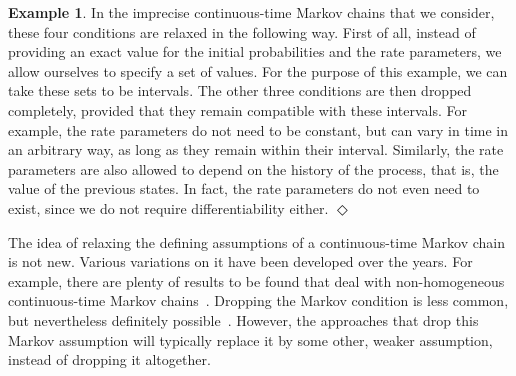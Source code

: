 \documentclass[10pt,a4paper]{paper}
\theoremstyle{definition}
\newtheorem{exmp}{Example}%
\newcommand{\exampleend}{\hfill$\Diamond$}
\begin{document}
\begin{exmp}




In the imprecise continuous-time Markov chains that we consider, these four conditions are relaxed in the following way. First of all, instead of providing an exact value for the initial probabilities and the rate parameters, we allow ourselves to specify a set of values. For the purpose of this example, we can take these sets to be intervals. The other three conditions are then dropped completely, provided that they remain compatible with these intervals. For example, the rate parameters do not need to be constant, but can vary in time in an arbitrary way, as long as they remain within their interval. Similarly, the rate parameters are also allowed to depend on the history of the process, that is, the value of the previous states. In fact, the rate parameters do not even need to exist, since we do not require differentiability either.
\exampleend
\end{exmp}

The idea of relaxing the defining assumptions of a continuous-time Markov chain is not new. Various variations on it have been developed over the years.
For example, there are plenty of results to be found that deal with non-homogeneous continuous-time Markov chains~\cite{rindos1995exact,aalen1978empirical,johnson1989nonhomogeneous}.
Dropping the Markov condition is less common, but nevertheless definitely possible~\cite{Harlamov:1320525}. However, the approaches that drop this Markov assumption will typically replace it by some other, weaker assumption, instead of dropping it altogether. %
\end{document}
